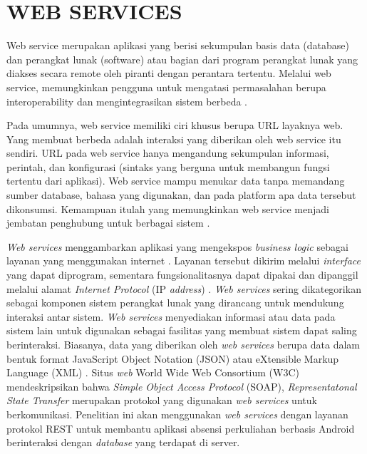 \section{\uppercase{WEB SERVICES}}
\par Web service merupakan aplikasi yang berisi sekumpulan basis data (database) dan perangkat lunak (software) atau bagian dari program perangkat lunak yang diakses secara remote oleh piranti dengan perantara tertentu. Melalui web service, memungkinkan pengguna untuk mengatasi permasalahan berupa interoperability dan mengintegrasikan sistem berbeda \citep{Chuangwei2011}.

\par Pada umumnya, web service memiliki ciri khusus berupa URL layaknya web. Yang membuat berbeda adalah interaksi yang diberikan oleh web service itu sendiri. URL pada web service hanya mengandung sekumpulan informasi, perintah, dan konfigurasi (sintaks yang berguna untuk membangun fungsi tertentu dari aplikasi). Web service mampu menukar data tanpa memandang sumber database, bahasa yang digunakan, dan pada platform apa data tersebut dikonsumsi. Kemampuan itulah yang memungkinkan web service menjadi jembatan penghubung untuk berbagai sistem \citep{Chuangwei2011}.

\par \textit{Web services} menggambarkan aplikasi yang mengekspos \textit{business logic} sebagai layanan yang menggunakan internet \citep{Mironela2009}. Layanan tersebut dikirim melalui \textit{interface} yang dapat diprogram, sementara fungsionalitasnya dapat dipakai dan dipanggil melalui alamat \textit{Internet Protocol} (IP \textit{address}) \citep{Wagh2012}. \textit{Web services} sering dikategorikan sebagai komponen sistem perangkat lunak yang dirancang untuk mendukung interaksi antar sistem. \textit{Web services} menyediakan informasi atau data pada sistem lain untuk digunakan sebagai fasilitas yang membuat sistem dapat saling berinteraksi. Biasanya, data yang diberikan oleh \textit{web services} berupa data dalam bentuk format JavaScript Object Notation (JSON) atau eXtensible Markup Language (XML) \citep{Rahman2013}. Situs \textit{web} World Wide Web Consortium (W3C) mendeskripsikan  bahwa \textit{Simple Object Access Protocol} (SOAP), \textit{Representatonal State Transfer} merupakan protokol yang digunakan \textit{web services} untuk berkomunikasi. Penelitian ini akan menggunakan \textit{web services} dengan layanan protokol REST untuk membantu aplikasi absensi perkuliahan berbasis Android berinteraksi dengan \textit{database} yang terdapat di server.


